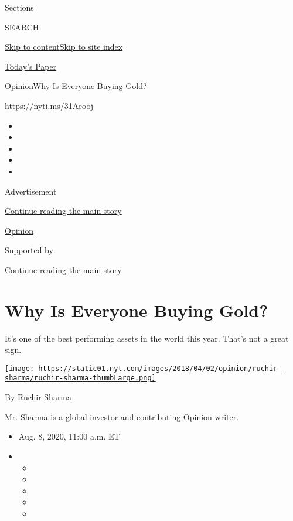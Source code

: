 Sections

SEARCH

\protect\hyperlink{site-content}{Skip to
content}\protect\hyperlink{site-index}{Skip to site index}

\href{https://myaccount.nytimes.com/auth/login?response_type=cookie\&client_id=vi}{}

\href{https://www.nytimes.com/section/todayspaper}{Today's Paper}

\href{/section/opinion}{Opinion}\textbar{}Why Is Everyone Buying Gold?

\href{https://nyti.ms/31Aeooj}{https://nyti.ms/31Aeooj}

\begin{itemize}
\item
\item
\item
\item
\item
\end{itemize}

Advertisement

\protect\hyperlink{after-top}{Continue reading the main story}

\href{/section/opinion}{Opinion}

Supported by

\protect\hyperlink{after-sponsor}{Continue reading the main story}

\hypertarget{why-is-everyone-buying-gold}{%
\section{Why Is Everyone Buying
Gold?}\label{why-is-everyone-buying-gold}}

It's one of the best performing assets in the world this year. That's
not a great sign.

\href{https://www.nytimes.com/by/ruchir-sharma}{\texttt{[image: https://static01.nyt.com/images/2018/04/02/opinion/ruchir-sharma/ruchir-sharma-thumbLarge.png]}}

By \href{https://www.nytimes.com/by/ruchir-sharma}{Ruchir Sharma}

Mr. Sharma is a global investor and contributing Opinion writer.

\begin{itemize}
\item
  Aug. 8, 2020, 11:00 a.m. ET
\item
  \begin{itemize}
  \item
  \item
  \item
  \item
  \item
  \end{itemize}
\end{itemize}

